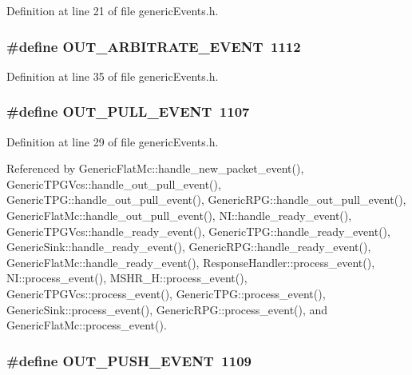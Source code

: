 Definition at line 21 of file genericEvents.h.
\subsubsection[{OUT\_\-ARBITRATE\_\-EVENT}]{\setlength{\rightskip}{0pt plus 5cm}\#define OUT\_\-ARBITRATE\_\-EVENT~1112}\label{genericEvents_8h_e1bed6a7bd5b431228e5fd4bfa42f22b}




Definition at line 35 of file genericEvents.h.
\subsubsection[{OUT\_\-PULL\_\-EVENT}]{\setlength{\rightskip}{0pt plus 5cm}\#define OUT\_\-PULL\_\-EVENT~1107}\label{genericEvents_8h_ee8e6d04df5ce1a2cbb97282f53c7377}




Definition at line 29 of file genericEvents.h.

Referenced by GenericFlatMc::handle\_\-new\_\-packet\_\-event(), GenericTPGVcs::handle\_\-out\_\-pull\_\-event(), GenericTPG::handle\_\-out\_\-pull\_\-event(), GenericRPG::handle\_\-out\_\-pull\_\-event(), GenericFlatMc::handle\_\-out\_\-pull\_\-event(), NI::handle\_\-ready\_\-event(), GenericTPGVcs::handle\_\-ready\_\-event(), GenericTPG::handle\_\-ready\_\-event(), GenericSink::handle\_\-ready\_\-event(), GenericRPG::handle\_\-ready\_\-event(), GenericFlatMc::handle\_\-ready\_\-event(), ResponseHandler::process\_\-event(), NI::process\_\-event(), MSHR\_\-H::process\_\-event(), GenericTPGVcs::process\_\-event(), GenericTPG::process\_\-event(), GenericSink::process\_\-event(), GenericRPG::process\_\-event(), and GenericFlatMc::process\_\-event().
\subsubsection[{OUT\_\-PUSH\_\-EVENT}]{\setlength{\rightskip}{0pt plus 5cm}\#define OUT\_\-PUSH\_\-EVENT~1109}\label{genericEvents_8h_01bcd72ce6a130f338e9e7f2f631cb3c}




